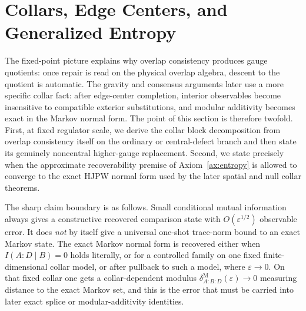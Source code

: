 \documentclass[11pt]{article}
\begin{document}
\section{Collars, Edge Centers, and Generalized Entropy}

The fixed-point picture explains why overlap consistency produces gauge quotients: once repair is
read on the physical overlap algebra, descent to the quotient is automatic. The gravity and
consensus arguments later use a more specific collar fact: after edge-center completion, interior
observables become insensitive to compatible exterior substitutions, and modular additivity becomes
exact in the Markov normal form. The point of this section is therefore twofold. First, at fixed
regulator scale, we derive the collar block decomposition from overlap consistency itself on the
ordinary or central-defect branch and then state its genuinely noncentral higher-gauge replacement.
Second, we state precisely when the approximate recoverability premise of Axiom~\ref{ax:entropy} is
allowed to converge to the exact HJPW normal form used by the later spatial and null collar
theorems.

The sharp claim boundary is as follows. Small conditional mutual information always gives a constructive recovered comparison state with \(O(\varepsilon^{1/2})\) observable error. It does \emph{not} by itself give a universal one-shot trace-norm bound to an exact Markov state. The exact Markov normal form is recovered either when \(I(A:D\mid B)=0\) holds literally, or for a controlled family on one fixed finite-dimensional collar model, or after pullback to such a model, where \(\varepsilon\to0\). On that fixed collar one gets a collar-dependent modulus \(\delta^{\mathrm M}_{A:B:D}(\varepsilon)\to0\) measuring distance to the exact Markov set, and this is the error that must be carried into later exact splice or modular-additivity identities.
\end{document}
